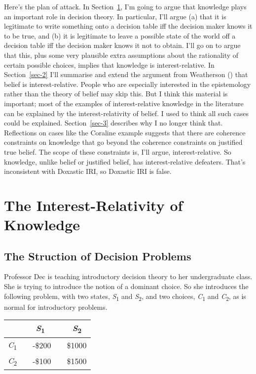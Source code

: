 \documentclass[
  10pt,
  letterpaper,
  DIV=11,
  numbers=noendperiod,
  twoside]{scrartcl}
\begin{document}
Here's the plan of attack. In Section~\ref{sec-1}, I'm going to argue
that knowledge plays an important role in decision theory. In
particular, I'll argue (a) that it is legitimate to write something onto
a decision table iff the decision maker knows it to be true, and (b) it
is legitimate to leave a possible state of the world off a decision
table iff the decision maker knows it not to obtain. I'll go on to argue
that this, plus some very plausible extra assumptions about the
rationality of certain possible choices, implies that knowledge is
interest-relative. In Section~\ref{sec-2} I'll summarise and extend the
argument from Weatherson ()
that belief is interest-relative. People who are especially interested
in the epistemology rather than the theory of belief may skip this. But
I think this material is important; most of the examples of
interest-relative knowledge in the literature can be explained by the
interest-relativity of belief. I used to think all such cases could be
explained. Section~\ref{sec-3} describes why I no longer think that.
Reflections on cases like the Coraline example suggests that there are
coherence constraints on knowledge that go beyond the coherence
constraints on justified true belief. The scope of these constraints is,
I'll argue, interest-relative. So knowledge, unlike belief or justified
belief, has interest-relative defeaters. That's inconsistent with
Doxastic IRI, so Doxastic IRI is false.

\section{The Interest-Relativity of Knowledge}\label{sec-1}

\subsection{The Struction of Decision
Problems}\label{the-struction-of-decision-problems}

Professor Dec is teaching introductory decision theory to her
undergraduate class. She is trying to introduce the notion of a dominant
choice. So she introduces the following problem, with two states,
\emph{S}\textsubscript{1} and \emph{S}\textsubscript{2}, and two
choices, \emph{C}\textsubscript{1} and \emph{C}\textsubscript{2}, as is
normal for introductory problems.

\begin{longtable}[]{@{}lcc@{}}
\toprule\noalign{}
~ & ~\emph{S}\textsubscript{1} ~ & ~\emph{S}\textsubscript{2} \\
\midrule\noalign{}
\endhead
\bottomrule\noalign{}
\endlastfoot
\emph{C}\textsubscript{1}~ & ~-\$200~ & ~\$1000 \\
\emph{C}\textsubscript{2}~ & ~-\$100~ & ~\$1500 \\
\end{longtable}
\end{document}
